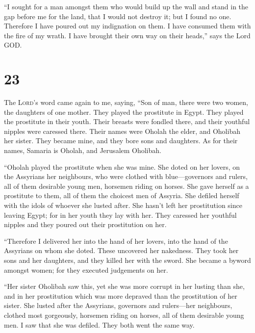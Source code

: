  ``I sought for a man amongst them who would build up the
wall and stand in the gap before me for the land, that I would not
destroy it; but I found no one.  Therefore I have poured
out my indignation on them. I have consumed them with the fire of my
wrath. I have brought their own way on their heads,'' says the Lord GOD.

\hypertarget{section-22}{%
\section{23}\label{section-22}}

 The \textsc{Lord}'s word came again to me, saying,
 ``Son of man, there were two women, the daughters of one
mother.  They played the prostitute in Egypt. They played
the prostitute in their youth. Their breasts were fondled there, and
their youthful nipples were caressed there.  Their names
were Oholah the elder, and Oholibah her sister. They became mine, and
they bore sons and daughters. As for their names, Samaria is Oholah, and
Jerusalem Oholibah.

 ``Oholah played the prostitute when she was mine. She
doted on her lovers, on the Assyrians her neighbours,  who
were clothed with blue---governors and rulers, all of them desirable
young men, horsemen riding on horses.  She gave herself as
a prostitute to them, all of them the choicest men of Assyria. She
defiled herself with the idols of whoever she lusted after.
 She hasn't left her prostitution since leaving Egypt; for
in her youth they lay with her. They caressed her youthful nipples and
they poured out their prostitution on her.

 ``Therefore I delivered her into the hand of her lovers,
into the hand of the Assyrians on whom she doted.  These
uncovered her nakedness. They took her sons and her daughters, and they
killed her with the sword. She became a byword amongst women; for they
executed judgements on her.

 ``Her sister Oholibah saw this, yet she was more corrupt
in her lusting than she, and in her prostitution which was more depraved
than the prostitution of her sister.  She lusted after
the Assyrians, governors and rulers---her neighbours, clothed most
gorgeously, horsemen riding on horses, all of them desirable young men.
 I saw that she was defiled. They both went the same way.

